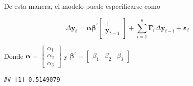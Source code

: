 \documentclass[12pt, twoside]{book}\usepackage[]{graphicx}\usepackage[]{color}
\makeatletter
\newenvironment{kframe}{%
 \def\at@end@of@kframe{}%
 \ifinner\ifhmode%
  \def\at@end@of@kframe{\end{minipage}}%
  \begin{minipage}{\columnwidth}%
 \fi\fi%
 \def\FrameCommand##1{\hskip\@totalleftmargin \hskip-\fboxsep
 \colorbox{shadecolor}{##1}\hskip-\fboxsep
     \hskip-\linewidth \hskip-\@totalleftmargin \hskip\columnwidth}%
 \MakeFramed {\advance\hsize-\width
   \@totalleftmargin\z@ \linewidth\hsize
   \@setminipage}}%
 {\par\unskip\endMakeFramed%
 \at@end@of@kframe}
\newenvironment{knitrout}{}{} %
\numberwithin{equation}{section}
\numberwithin{theorem}{section}
\numberwithin{teorema}{section}
\numberwithin{defi}{section}
\numberwithin{prop}{section}
\numberwithin{defi}{section}
\theoremstyle{plain}
\makeatother
\begin{document}
De esta manera, el modelo puede especificarse como 

\begin{equation}
 \Delta\mathbf{y}_{t} = \boldsymbol{\alpha \beta}^{'}\left[\begin{array}{c}1 \\ \mathbf{y}_{t-1}\end{array}\right]+\sum_{i=1}^{8}\boldsymbol{\Gamma}_{i}\Delta\mathbf{y}_{t-i}+\boldsymbol{\varepsilon}_{t}
\end{equation}

Donde $\boldsymbol{\alpha}=\left[\begin{array}{c} \alpha_{1} \\ \alpha_{2} \\ \alpha_{3} \end{array}\right]$ y $\boldsymbol{\beta}^{'} = \left[\begin{array}{ccc} \beta_{1} & \beta_{2} & \beta_{3} \end{array}\right]$


\begin{knitrout}
\color{fgcolor}\begin{kframe}
\begin{verbatim}
## [1] 0.5149079
\end{verbatim}
\end{kframe}
\end{knitrout}
\end{document}
